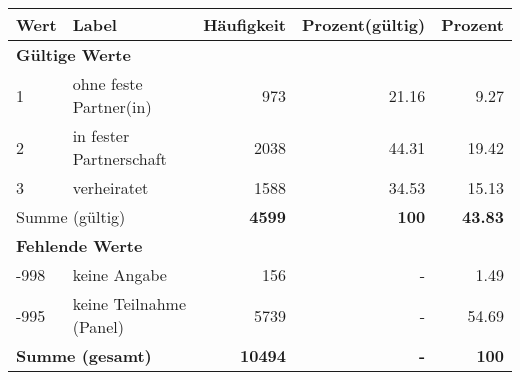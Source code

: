     \begin{longtable}{lXrrr}
     \toprule
     \textbf{Wert} & \textbf{Label} & \textbf{Häufigkeit} & \textbf{Prozent(gültig)} & \textbf{Prozent} \\
     \endhead
     \midrule
     \multicolumn{5}{l}{\textbf{Gültige Werte}}\\

     1 &
     \multicolumn{1}{X}{ ohne feste Partner(in)   } &


       \num{973} &
       \num[round-mode=places,round-precision=2]{21,16} &
         \num[round-mode=places,round-precision=2]{9,27} \\

     2 &
     \multicolumn{1}{X}{ in fester Partnerschaft   } &


       \num{2038} &
       \num[round-mode=places,round-precision=2]{44,31} &
         \num[round-mode=places,round-precision=2]{19,42} \\

     3 &
     \multicolumn{1}{X}{ verheiratet   } &


       \num{1588} &
       \num[round-mode=places,round-precision=2]{34,53} &
         \num[round-mode=places,round-precision=2]{15,13} \\
     \midrule
     \multicolumn{2}{l}{Summe (gültig)} &
       \textbf{\num{4599}} &
     \textbf{100} &
       \textbf{\num[round-mode=places,round-precision=2]{43,83}} \\
     \multicolumn{5}{l}{\textbf{Fehlende Werte}}\\
       -998 &
       keine Angabe &
         \num{156} &
        - &
         \num[round-mode=places,round-precision=2]{1,49} \\
       -995 &
       keine Teilnahme (Panel) &
         \num{5739} &
        - &
         \num[round-mode=places,round-precision=2]{54,69} \\
     \midrule
     \multicolumn{2}{l}{\textbf{Summe (gesamt)}} &
          \textbf{\num{10494}} &
        \textbf{-} &
        \textbf{100} \\
     \bottomrule
     \end{longtable}
     
